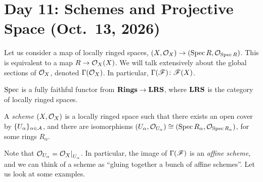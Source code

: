 \section{Day 11: Schemes and Projective Space (Oct.\ 13, 2026)}
Let us consider a map of locally ringed spaces, $(X, \mathcal O_X) \to (\operatorname{Spec} R, \mathcal O_{\operatorname{Spec} R})$. This is equivalent to a map $R \to \mathcal O_X(X)$. We will talk extensively about the global sections of $\mathcal O_X$, denoted $\Gamma(\mathcal O_X)$. In particular, $\Gamma(\mathscr F) \colon \mathscr F(X)$.

$\operatorname{Spec}$ is a fully faithful functor from $\mathbf{Rings} \to \mathbf{LRS}$, where $\mathbf{LRS}$ is the category of locally ringed spaces.

\begin{definition} \label{defn:scheme}
    A \textit{scheme} $(X, \mathcal O_X)$ is a locally ringed space such that there exists an open cover by $\{U_\alpha\}_{\alpha \in \mathcal A}$, and there are isomorphisms $(U_\alpha, \mathcal O_{U_\alpha}) \cong (\operatorname{Spec} R_\alpha, \mathcal O_{\operatorname{Spec} R_\alpha})$, for some rings $R_\alpha$.
\end{definition}

Note that $\SO_{U_\alpha} = \restr{\SO_X}{U_\alpha}$. In particular, the image of $\Gamma(\mathscr F)$ is an \textit{affine scheme}, and we can think of a scheme as ``gluing together a bunch of affine schemes''. Let us look at some examples.

